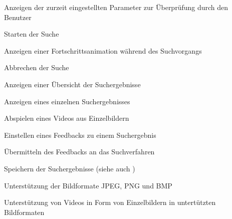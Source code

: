 \begin{description}
	\item[] Anzeigen der zurzeit eingestellten Parameter zur Überprüfung durch den Benutzer
	\newline
	\item[] Starten der Suche
	\item[] Anzeigen einer Fortschrittsanimation während des Suchvorgangs
	\item[] Abbrechen der Suche
	\newline
	\item[] Anzeigen einer \"Ubersicht der Suchergebnisse
	\item[] Anzeigen eines einzelnen Suchergebnisses
	\item[] Abspielen eines Videos aus Einzelbildern
	\item[] Einstellen eines Feedbacks zu einem Suchergebnis
	\item[] \"Ubermitteln des Feedbacks an das Suchverfahren
	\item[] Speichern der Suchergebnisse (siehe auch )
	\newline
	\item[] Unterstützung der Bildformate JPEG, PNG und BMP
	\item[] Unterstützung von Videos in Form von Einzelbildern in untert\"utzten Bildformaten
\end{description}

